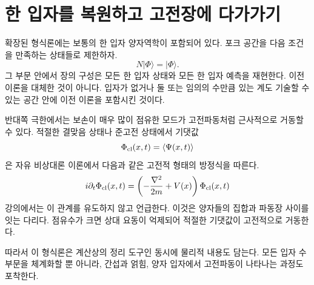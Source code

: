\begin{classroomqa}
\end{classroomqa}

\begin{classroomqa}
\end{classroomqa}

\section{한 입자를 복원하고 고전장에 다가가기}

확장된 형식론에는 보통의 한 입자 양자역학이 포함되어 있다. 포크 공간을 다음 조건을 만족하는 상태들로 제한하자.
\begin{equation}
N|\Phi\rangle=|\Phi\rangle.
\end{equation}
그 부문 안에서 장의 구성은 모든 한 입자 상태와 모든 한 입자 예측을 재현한다. 이전 이론을 대체한 것이 아니다. 입자가 없거나 둘 또는 임의의 수만큼 있는 계도 기술할 수 있는 공간 안에 이전 이론을 포함시킨 것이다.

반대쪽 극한에서는 보손이 매우 많이 점유한 모드가 고전파동처럼 근사적으로 거동할 수 있다. 적절한 결맞음 상태나 준고전 상태에서 기댓값
\begin{equation}
\Phi_{\rm cl}(x,t)=\langle\Psi(x,t)\rangle
\end{equation}
은 자유 비상대론 이론에서 다음과 같은 고전적 형태의 방정식을 따른다.
\begin{equation}
i\partial_t\Phi_{\rm cl}(x,t)
=\left(-\frac{\nabla^2}{2m}+V(x)\right)\Phi_{\rm cl}(x,t)
\label{eq:l07-classical-schrodinger}
\end{equation}
강의에서는 이 관계를 유도하지 않고 언급한다. 이것은 양자들의 집합과 파동장 사이를 잇는 다리다. 점유수가 크면 상대 요동이 억제되어 적절한 기댓값이 고전적으로 거동한다.

따라서 이 형식론은 계산상의 정리 도구인 동시에 물리적 내용도 담는다. 모든 입자 수 부문을 체계화할 뿐 아니라, 간섭과 얽힘, 양자 입자에서 고전파동이 나타나는 과정도 포착한다.

